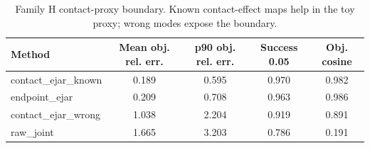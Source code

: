 \begin{table}[t]
\centering
\small
\caption{Family H contact-proxy boundary. Known contact-effect maps help in the toy proxy; wrong modes expose the boundary.}
\label{tab:contact-proxy}
\begin{tabular}{lcccc}
\toprule
Method & Mean obj. rel. err. & p90 obj. rel. err. & Success 0.05 & Obj. cosine \\
\midrule
contact\_ejar\_known & 0.189 & 0.595 & 0.970 & 0.982 \\
endpoint\_ejar & 0.209 & 0.708 & 0.963 & 0.986 \\
contact\_ejar\_wrong & 1.038 & 2.204 & 0.919 & 0.891 \\
raw\_joint & 1.665 & 3.203 & 0.786 & 0.191 \\
\bottomrule
\end{tabular}
\end{table}
